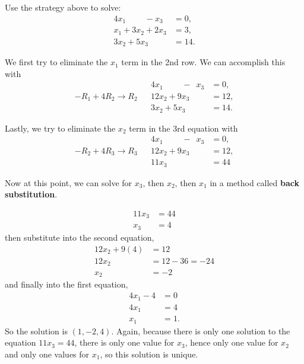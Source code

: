 \begin{example} \label{ex:solve:linear:syst}
Use the strategy above to solve:
%
\begin{align*}
4x_1 \phantom{+3x_2}- x_3 & = 0, \\
x_1+3x_2 +2x_3 & = 3, \\
3x_2 + 5x_3 & = 14.
\end{align*}


\solution

We first try to eliminate the $x_1$ term in the 2nd row.  We can accomplish this with
%
\begin{align*}
&&4x_1  \phantom{+3x_2}-\phantom{9}x_3 & = 0, \\
-R_1+4R_2 \rightarrow R_2 && 12x_2 +9x_3 & = 12, \\
&&3x_2 + 5x_3 & = 14.
\end{align*}

Lastly, we try to eliminate the $x_2$ term in the 3rd equation with
%
\begin{align*}
&&4x_1  \phantom{+3x_2}- \phantom{9}x_3 & = 0, \\
-R_2+4R_3 \rightarrow R_3 && 12x_2 +9x_3 & = 12, \\
&& 11x_3 & =  44
\end{align*}

Now at this point, we can solve for $x_3$, then $x_2$, then $x_1$ in a method called \textbf{back substitution}.

\begin{align*}
11 x_3 & = 44 \\
x_3 & = 4
\end{align*}
then substitute into the second equation,
%
\begin{align*}
12x_2 + 9(4) & = 12 \\
12 x_2 & = 12-36=-24 \\
x_2 & = -2
\end{align*}
and finally into the first equation,
%
\begin{align*}
4x_1 - 4 & = 0 \\
4x_1 & = 4 \\
x_1 & = 1.
\end{align*}
So the solution is $(1,-2,4)$.    Again, because there is only one solution to the equation $11x_3=44$, there is only one value for $x_3$, hence only one value for $x_2$ and only one values for $x_1$, so this solution is unique.
\end{example}

\phantom{Here's some text}

